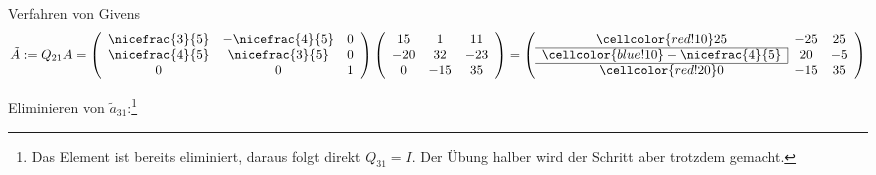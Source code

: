 \begin{example}{Verfahren von Givens}
    \[ 
        \tilde{A} := Q_{21}A =
        \left(
        \begin{array}{ccc}
                \nicefrac{3}{5} & -\nicefrac{4}{5} & 0 \\ 
                \nicefrac{4}{5} & \nicefrac{3}{5}  & 0 \\ 
                0               & 0                & 1
            \end{array}
        \right)
        \left(
        \begin{array}{cccc}
                15  & 1   & 11  \\ 
                -20 & 32  & -23 \\ 
                0   & -15 & 35
            \end{array}
        \right)
        = 
        \left(
        \begin{array}{cccc}
                \cellcolor{red!10}25                                      & -25 & 25 \\ \cline{1-1}
                \multicolumn{1}{c|}{\cellcolor{blue!10} -\nicefrac{4}{5}} & 20  & -5 \\ \cline{1-1}
                \cellcolor{red!20} 0                                      & -15 & 35
            \end{array}
        \right)
    \]
    
    Eliminieren von $\tilde{a}_{31}$:\footnote{Das Element ist bereits eliminiert, daraus folgt direkt $Q_{31} = I$. Der Übung halber wird der Schritt aber trotzdem gemacht.}
    

\end{example}
